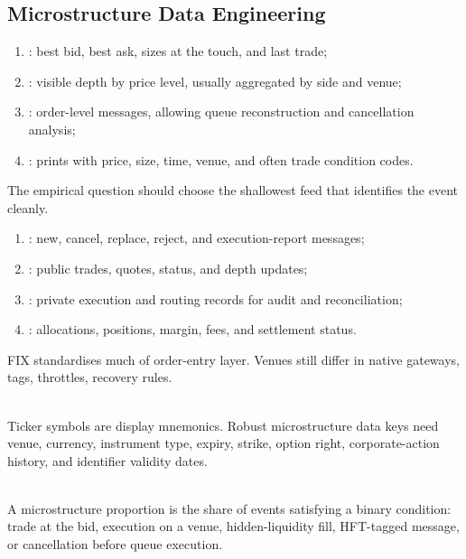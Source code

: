 \subsection{Microstructure Data Engineering}

\begin{taxonomy} 
\begin{enumerate}[label=\roman*.]
\setlength{\itemsep}{0pt}
\item {}: best bid, best ask, sizes at the touch, and last trade;
\item {}: visible depth by price level, usually aggregated by side and venue;
\item {}: order-level messages, allowing queue reconstruction and cancellation analysis;
\item {}: prints with price, size, time, venue, and often trade condition codes.
\end{enumerate}
The empirical question should choose the shallowest feed that identifies the event cleanly.
\end{taxonomy}

\begin{taxonomy} 
\begin{enumerate}[label=\roman*.]
\setlength{\itemsep}{0pt}
\item {}: new, cancel, replace, reject, and execution-report messages;
\item {}: public trades, quotes, status, and depth updates;
\item {}: private execution and routing records for audit and reconciliation;
\item {}: allocations, positions, margin, fees, and settlement status.
\end{enumerate}
FIX standardises much of order-entry layer. Venues still differ in native gateways, tags, throttles, recovery rules.
\end{taxonomy}

\begin{caveat} \\
Ticker symbols are display mnemonics. Robust microstructure data keys need venue, currency, instrument type, expiry, strike, option right, corporate-action history, and identifier validity dates.
\end{caveat}

\begin{definition} \\
A microstructure proportion is the share of events satisfying a binary condition: trade at the bid, execution on a venue, hidden-liquidity fill, HFT-tagged message, or cancellation before queue execution.
\end{definition}

